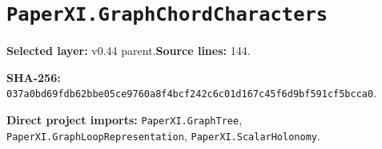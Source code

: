 \documentclass[10pt,oneside]{book}
\begin{document}
\section{\texorpdfstring{\nolinkurl{PaperXI.GraphChordCharacters}}{PaperXI.GraphChordCharacters}}\label{module:PaperXI.GraphChordCharacters}

\textbf{Selected layer:} v0.44 parent.\quad\textbf{Source lines:} 144.\par\textbf{SHA-256:} {\scriptsize\nolinkurl{037a0bd69fdb62bbe05ce9760a8f4bcf242c6c01d167c45f6d9bf591cf5bcca0}}.


\textbf{Direct project imports:} \nolinkurl{PaperXI.GraphTree}, \nolinkurl{PaperXI.GraphLoopRepresentation}, \nolinkurl{PaperXI.ScalarHolonomy}.
\end{document}
